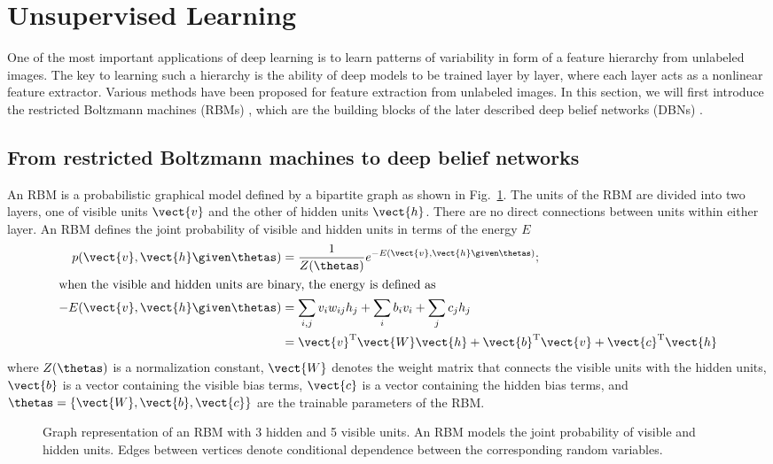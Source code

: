 \section{Unsupervised Learning}


One of the most important applications of deep learning is to learn patterns of
variability in form of a feature hierarchy from unlabeled images. The key to
learning such a hierarchy is the ability of deep models to be trained layer by
layer, where each layer acts as a nonlinear feature extractor. Various methods
have been proposed for feature extraction from unlabeled images. In this
section, we will first introduce the restricted Boltzmann machines (RBMs)
\citep{freund1992,hinton2010a}, which are the building blocks of the later
described deep belief networks (DBNs) \citep{hinton2006b}.

\subsection{From restricted Boltzmann machines to deep belief networks}

An RBM is a probabilistic graphical model defined by a bipartite graph as shown
in Fig.~\ref{fig:rbm}. The units of the RBM are divided into two layers, one of
visible units $\vect{v}$ and the other of hidden units $\vect{h}$. There are no
direct connections between units within either layer. An RBM defines the joint
probability of visible and hidden units in terms of the energy $E$
\begin{align}
p(\vect{v}, \vect{h} \given \thetas) &=
\frac{1}{Z(\thetas)}e^{-E(\vect{v}, \vect{h} \given \thetas)}; \\
\intertext{when the visible and hidden units are binary, the energy is defined
as} 
-E(\vect{v}, \vect{h}\given \thetas) &= \sum_{i, j}v_i w_{ij} h_j +
\sum_i b_i v_i + \sum_j c_j h_j \\
&= \vect{v}^\textup{T}\vect{W}\vect{h} + \vect{b}^\textup{T}\vect{v} +
\vect{c}^\textup{T}\vect{h}
\end{align}
where $Z(\thetas)$ is a normalization constant, $\vect{W}$ denotes the weight
matrix that connects the visible units with the hidden units, $\vect{b}$ is a
vector containing the visible bias terms, $\vect{c}$ is a vector containing the
hidden bias terms, and $\thetas = \{\vect{W}, \vect{b}, \vect{c}\}$ are the
trainable parameters of the RBM.

\begin{figure}
\centering

\caption{Graph representation of an RBM with 3 hidden and 5 visible units.
  An RBM models the joint probability of visible and hidden units. Edges between
  vertices denote conditional dependence between the corresponding random
  variables.}
\label{fig:rbm}
\end{figure}

